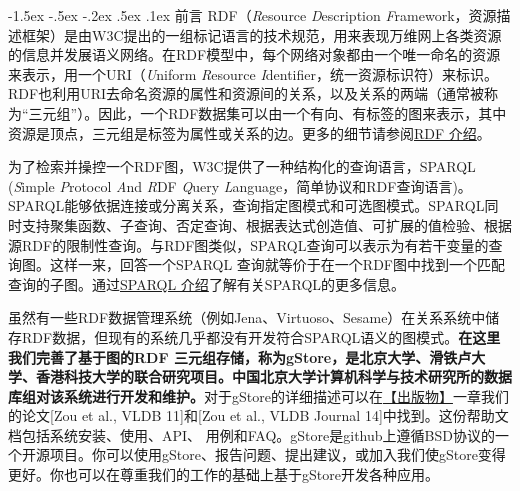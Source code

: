 \documentclass[titlepage, a4paper, 12pt]{article}
\makeatletter
\newcommand{\sihao}{\fontsize{14pt}{\baselineskip}\selectfont}
\renewcommand\section{\@startsection{section}{1}{\z@}%
{-1.5ex \@plus -.5ex \@minus -.2ex}%
{.5ex \@plus .1ex}%
{\normalfont\sihao\CJKfamily{hei}}}
\makeatother
\begin{document}
\setcounter{tocdepth}{4}
\renewcommand{\contentsname}{目\hspace{2em}录} %
\begin{center}  %
\tableofcontents
\end{center}
\clearpage


\section{前言}
RDF（\emph{R}esource \emph{D}escription \emph{F}ramework，资源描述框架）是由W3C提出的一组标记语言的技术规范，用来表现万维网上各类资源的信息并发展语义网络。在RDF模型中，每个网络对象都由一个唯一命名的资源来表示，用一个URI（\emph{U}niform \emph{R}esource \emph{I}dentifier，统一资源标识符）来标识。RDF也利用URI去命名资源的属性和资源间的关系，以及关系的两端（通常被称为“三元组”）。因此，一个RDF数据集可以由一个有向、有标签的图来表示，其中资源是顶点，三元组是标签为属性或关系的边。更多的细节请参阅\href{https://www.w3.org/RDF/}{RDF 介绍}。

为了检索并操控一个RDF图，W3C提供了一种结构化的查询语言，SPARQL (\emph{S}imple \emph{P}rotocol \emph{A}nd \emph{R}DF \emph{Q}uery \emph{L}anguage，简单协议和RDF查询语言)。SPARQL能够依据连接或分离关系，查询指定图模式和可选图模式。SPARQL同时支持聚集函数、子查询、否定查询、根据表达式创造值、可扩展的值检验、根据源RDF的限制性查询。与RDF图类似，SPARQL查询可以表示为有若干变量的查询图。这样一来，回答一个SPARQL 查询就等价于在一个RDF图中找到一个匹配查询的子图。通过\href{https://www.w3.org/TR/sparql11-query/}{SPARQL 介绍}了解有关SPARQL的更多信息。

虽然有一些RDF数据管理系统（例如Jena、Virtuoso、Sesame）在关系系统中储存RDF数据，但现有的系统几乎都没有开发符合SPARQL语义的图模式。\textbf{在这里我们完善了基于图的RDF 三元组存储，称为gStore，是北京大学、滑铁卢大学、香港科技大学的联合研究项目。中国北京大学计算机科学与技术研究所的数据库组对该系统进行开发和维护。}对于gStore的详细描述可以在\hyperref[chapter08]{【出版物】}一章我们的论文{[}Zou et al., VLDB 11{]}和{[}Zou et al., VLDB Journal 14{]}中找到。这份帮助文档包括系统安装、使用、API、 用例和FAQ。gStore是github上遵循BSD协议的一个开源项目。你可以使用gStore、报告问题、提出建议，或加入我们使gStore变得更好。你也可以在尊重我们的工作的基础上基于gStore开发各种应用。
\end{document}
